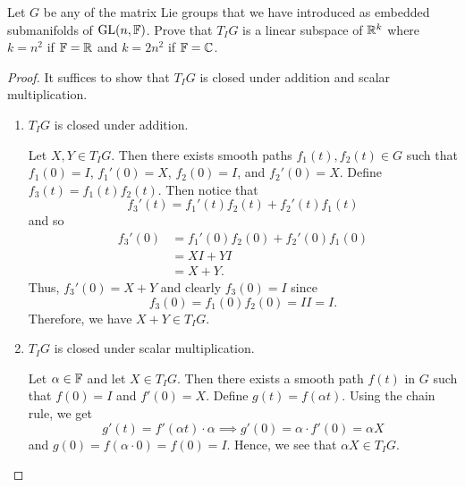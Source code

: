 \documentclass[a4paper]{article}
\begin{document}
\begin{problem}
    Let \( G  \) be any of the matrix Lie groups that we have introduced as embedded submanifolds of \( \text{GL}(n,\mathbb{F})  \). Prove that \( {T}_{I}G  \) is a linear subspace of \( \mathbb{R}^{k} \) where \( k = n^{2} \) if \( \mathbb{F} = \mathbb{R}  \) and \( k = 2 n^{2} \) if \( \mathbb{F} = \mathbb{C}  \). 
\end{problem}
\begin{proof}
It suffices to show that \( {T}_{I}G \) is closed under addition and scalar multiplication.
\begin{enumerate}
    \item[(i)] \( {T}_{I}G \) is closed under addition. 

        Let \( X,Y \in {T}_{I}G \). Then there exists smooth paths \( {f}_{1}(t), {f}_{2}(t) \in G  \) such that \( {f}_{1}(0) = I  \), \( {f}_{1}'(0) = X  \), \( {f}_{2}(0) = I  \), and \( {f}_{2}'(0) = X  \). Define \( {f}_{3}(t) = {f}_{1}(t) {f}_{2}(t) \). Then notice that  
        \[  {f}_{3}'(t) = {f}_{1}'(t) {f}_{2}(t) + {f}_{2}'(t) {f}_{1}(t) \]
        and so
        \begin{align*}
            {f}_{3}'(0) &= {f}_{1}'(0) {f}_{2}(0) + {f}_{2}'(0) {f}_{1}(0) \\
                        &= XI + YI \\
                        &= X + Y. 
        \end{align*}
        Thus, \( {f}_{3}'(0) = X +  Y \) and clearly \( {f}_{3}(0) = I  \) since 
        \[  {f}_{3}(0) = {f}_{1}(0) {f}_{2}(0) = II = I.  \]
        Therefore, we have \( X + Y \in {T}_{I}G \).
    \item[(ii)] \( {T}_{I} G  \) is closed under scalar multiplication.

        Let \( \alpha \in \mathbb{F}  \) and let \( X \in {T}_{I}G \). Then there exists a smooth path \( f(t) \) in \( G  \) such that \( f(0) = I  \) and \( f'(0) = X  \). Define \( g(t) = f(\alpha t) \). Using the chain rule, we get
        \[  g'(t) = f'(\alpha t) \cdot \alpha \implies g'(0) = \alpha \cdot f'(0) = \alpha X  \]
        and \( g(0) = f(\alpha \cdot 0 ) = f(0) = I  \). Hence, we see that \( \alpha X \in {T}_{I}G \).
\end{enumerate}
\end{proof}
\end{document}
